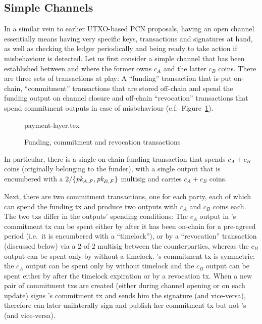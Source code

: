 \subsection{Simple Channels}
  In a similar vein to earlier UTXO-based PCN proposals, having an open channel essentially
  means having very specific keys, transactions and signatures at hand, as well
  as checking the ledger periodically and being ready to take action if
  misbehaviour is detected. Let us first consider a simple channel that has been
  established between \alice and \bob where the former owns $c_A$ and the latter
  $c_B$ coins. There are three sets of transactions at play: A ``funding''
  transaction that is put on-chain, ``commitment'' transactions that are stored
  off-chain and
  spend the funding output on channel closure and off-chain ``revocation''
  transactions that spend commitment outputs in case of misbehaviour (c.f.\
  Figure~\ref{figure:payment-layer}).

  \begin{figure}
    {payment-layer.tex}
    \caption{Funding, commitment and revocation transactions}
    \label{figure:payment-layer}
  \end{figure}

  In particular, there is a single on-chain funding transaction that spends $c_A
  + c_B$ coins (originally belonging to the funder), with a single output that is encumbered with a
  $2/\{\textit{pk}_{A, F}, \textit{pk}_{B, F}\}$ multisig and carries $c_A + c_B$ coins.

  Next, there are two commitment transactions, one for each party, each of which can spend the
  funding tx and produce two outputs with $c_A$ and $c_B$ coins each. The two
  txs differ in the outputs' spending conditions: The $c_A$ output in \alice's
  commitment tx can be spent either by \alice after it has been on-chain for a
  pre-agreed period (i.e.\ it is encumbered with a ``timelock''), or by a
  ``revocation'' transaction (discussed below) via a $2$-of-$2$ multisig between
  the counterparties, whereas the $c_B$ output can be spent only by \bob without
  a timelock. \bob's commitment tx is symmetric: the $c_A$ output can be spent
  only by \alice without timelock and the $c_B$ output can be spent either by
  \bob after the timelock expiration or by a revocation tx. When a new pair of
  commitment txs are created (either during channel opening or on each update)
  \alice signs \bob's commitment tx and sends him the signature (and
  vice-versa), therefore \alice can later unilaterally sign and publish her commitment
  tx but not \bob's (and vice-versa).

